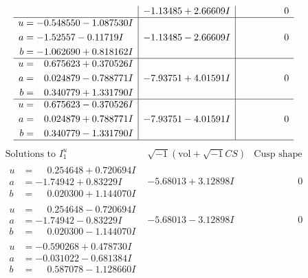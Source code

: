 \documentclass[1p]{elsarticle_modified}
\theoremstyle{definition}
\newcommand{\I}{\sqrt{-1}}
\begin{document}
$$\begin{array}{c|c|c}
 & -1.13485 + 2.66609 I & \phantom{-0.000000 } 0 \\ \hline\begin{aligned}
u &= -0.548550 - 1.087530 I \\
a &= -1.52557 - 0.11719 I \\
b &= -1.062690 + 0.818162 I\end{aligned}
 & -1.13485 - 2.66609 I & \phantom{-0.000000 } 0 \\ \hline\begin{aligned}
u &= \phantom{-}0.675623 + 0.370526 I \\
a &= \phantom{-}0.024879 - 0.788771 I \\
b &= \phantom{-}0.340779 + 1.331790 I\end{aligned}
 & -7.93751 + 4.01591 I & \phantom{-0.000000 } 0 \\ \hline\begin{aligned}
u &= \phantom{-}0.675623 - 0.370526 I \\
a &= \phantom{-}0.024879 + 0.788771 I \\
b &= \phantom{-}0.340779 - 1.331790 I\end{aligned}
 & -7.93751 - 4.01591 I & \phantom{-0.000000 } 0\\
 \hline 
 \end{array}$$\newpage$$\begin{array}{c|c|c}  
\text{Solutions to }I^u_{1}& \I (\text{vol} + \sqrt{-1}CS) & \text{Cusp shape}\\
 \hline 
\begin{aligned}
u &= \phantom{-}0.254648 + 0.720694 I \\
a &= -1.74942 + 0.83229 I \\
b &= \phantom{-}0.020300 + 1.144070 I\end{aligned}
 & -5.68013 + 3.12898 I & \phantom{-0.000000 } 0 \\ \hline\begin{aligned}
u &= \phantom{-}0.254648 - 0.720694 I \\
a &= -1.74942 - 0.83229 I \\
b &= \phantom{-}0.020300 - 1.144070 I\end{aligned}
 & -5.68013 - 3.12898 I & \phantom{-0.000000 } 0 \\ \hline\begin{aligned}
u &= -0.590268 + 0.478730 I \\
a &= -0.031022 - 0.681384 I \\
b &= \phantom{-}0.587078 - 1.128660 I\end{aligned}

\end{array}$$
\end{document}
